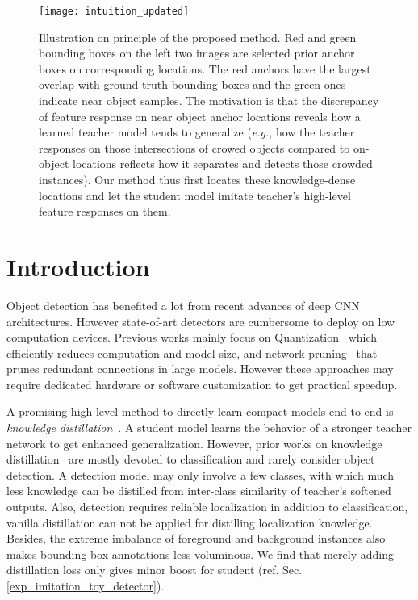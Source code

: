 \documentclass[10pt,twocolumn,letterpaper]{article}
\begin{document}
\begin{figure}[!t]
	\centering
\texttt{[image: intuition\_updated]}
	\caption{Illustration on principle of the proposed method. Red and green bounding boxes on the left two images are selected prior anchor boxes on corresponding locations. The red anchors have the largest overlap with ground truth bounding boxes and the green ones indicate near object samples. 
	The motivation is that the discrepancy of feature response on near object anchor locations reveals how a learned teacher model tends to generalize (\emph{e.g.}, how the teacher responses on those intersections of crowed objects compared to on-object locations reflects how it separates and detects those crowded instances). Our method thus first locates these knowledge-dense locations and let the student model imitate teacher's high-level feature responses on them.}
	\label{intuition}
	\vspace{-10pt}
\end{figure}

\section{Introduction}
\label{intro}
Object detection has benefited a lot from recent advances of deep CNN architectures. However state-of-art detectors are cumbersome to deploy on low computation devices. Previous works mainly focus on Quantization~\cite{Gysel2016HardwareorientedAO, Han2015LearningBW, Wu2016QuantizedCN, rastegari2016xnor} which efficiently reduces computation and model size, and network pruning~\cite{Han2015LearningBW, Han2015DeepCC, alvarez2016learning, wen2016learning} that prunes redundant connections in large models. However these approaches may require dedicated hardware or software customization to get practical speedup.


A promising high level method to directly learn compact models end-to-end is \emph{knowledge distillation}~\cite{Hinton2015DistillingTK}. A student model learns the behavior of a stronger teacher network to get enhanced generalization.
However, prior works on knowledge distillation~\cite{Hinton2015DistillingTK,romero2014fitnets, zagoruyko2016paying, chen2017darkrank, huang2017like} are mostly devoted to classification and rarely consider object detection. A detection model may only involve a few classes, with which much less knowledge can be distilled from inter-class similarity of teacher's softened outputs. Also, detection requires reliable localization in addition to classification, vanilla distillation can not be applied for distilling localization knowledge. Besides, the extreme imbalance of foreground and background instances also makes bounding box annotations less voluminous.
We find that merely adding distillation loss only gives minor boost for student (ref. Sec. \ref{exp_imitation_toy_detector}). 
\end{document}
